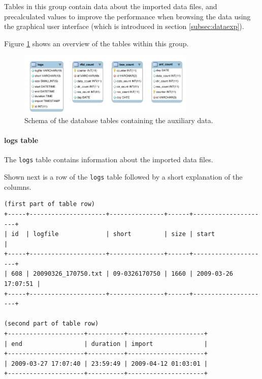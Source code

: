 Tables in this group contain data about the imported data files, and precalculated values to improve the performance when browsing the data using the graphical user interface (which is introduced in section \ref{subsec:dataexp}).

Figure \ref{fig:auxiliary_tables} shows an overview of the tables within this group. 


\begin{figure}[htpb]
\begin{center}
  \includegraphics[width=0.75\textwidth]{assets/pdf/auxiliary_tables_schema.pdf}
  \caption[Schema of database tables containing the auxiliary data]{Schema of the database tables containing the auxiliary data.}
  \label{fig:auxiliary_tables}
\end{center}
\end{figure}

\paragraph{logs table}
\label{para:logs_table} 

The \lstinline|logs| table contains information about the imported data files.

Shown next is a row of the \lstinline|logs| table followed by a short explanation of the columns.

\codescript
{}
\begin{lstlisting}[frame=none]
(first part of table row)
+-----+---------------------+---------------+------+---------------------+
| id  | logfile             | short         | size | start               |
+-----+---------------------+---------------+------+---------------------+
| 608 | 20090326_170750.txt | 09-0326170750 | 1660 | 2009-03-26 17:07:51 |
+-----+---------------------+---------------+------+---------------------+

(second part of table row)
+---------------------+----------+---------------------+
| end                 | duration | import              |
+---------------------+----------+---------------------+
| 2009-03-27 17:07:40 | 23:59:49 | 2009-04-12 01:03:01 | 
+---------------------+----------+---------------------+

\end{lstlisting}


